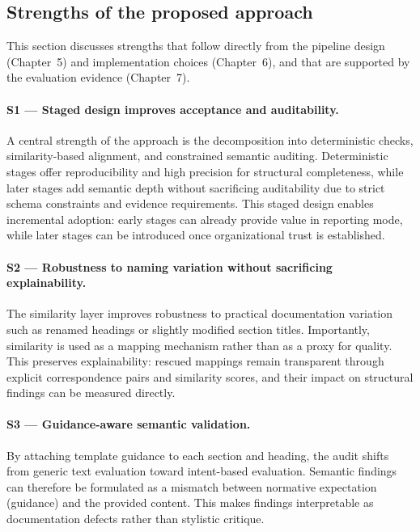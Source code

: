 \subsection{Strengths of the proposed approach}
\label{sec:discussion_strengths}

This section discusses strengths that follow directly from the pipeline design (Chapter~5) and implementation choices (Chapter~6), and that are supported by the evaluation evidence (Chapter~7).

\paragraph{S1 --- Staged design improves acceptance and auditability.}
A central strength of the approach is the decomposition into deterministic checks, similarity-based alignment, and constrained semantic auditing. Deterministic stages offer reproducibility and high precision for structural completeness, while later stages add semantic depth without sacrificing auditability due to strict schema constraints and evidence requirements. This staged design enables incremental adoption: early stages can already provide value in reporting mode, while later stages can be introduced once organizational trust is established.

\paragraph{S2 --- Robustness to naming variation without sacrificing explainability.}
The similarity layer improves robustness to practical documentation variation such as renamed headings or slightly modified section titles. Importantly, similarity is used as a mapping mechanism rather than as a proxy for quality. This preserves explainability: rescued mappings remain transparent through explicit correspondence pairs and similarity scores, and their impact on structural findings can be measured directly.

\paragraph{S3 --- Guidance-aware semantic validation.}
By attaching template guidance to each section and heading, the audit shifts from generic text evaluation toward intent-based evaluation. Semantic findings can therefore be formulated as a mismatch between normative expectation (guidance) and the provided content. This makes findings interpretable as documentation defects rather than stylistic critique.

